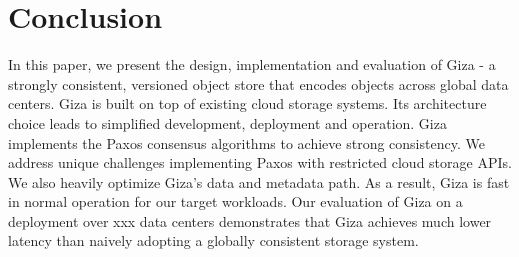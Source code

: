 \section{Conclusion}

In this paper, we present the design, implementation and evaluation of Giza - a strongly consistent, versioned object store that encodes objects across global data centers. Giza is built on top of existing cloud storage systems. 
Its architecture choice leads to simplified development, deployment and operation. Giza implements the Paxos consensus algorithms to achieve strong consistency. We address unique challenges implementing Paxos with restricted cloud storage APIs. We also heavily optimize Giza's data and metadata path. As a result, Giza is fast in normal operation for our target workloads.
Our evaluation of Giza on a deployment over xxx data centers demonstrates that Giza achieves much lower latency than naively adopting a globally consistent storage system.

